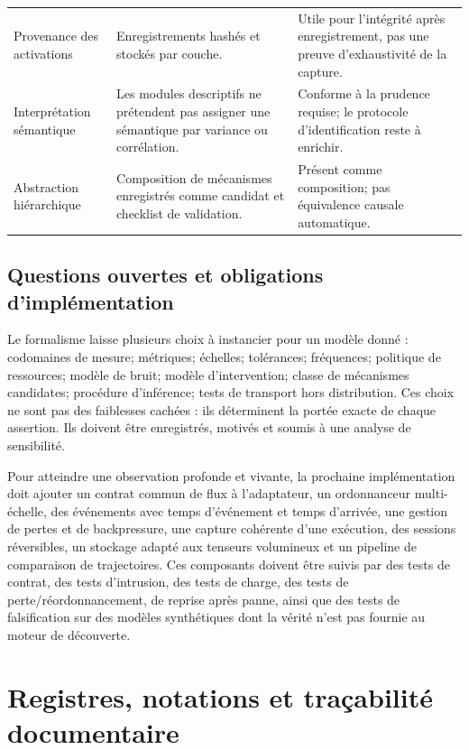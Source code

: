 \documentclass[11pt,oneside]{book}
\theoremstyle{definition}
\theoremstyle{remark}
\newcommand{\1}{\mathbf 1}
\begin{document}
\begin{longtable}{p{}p{}p{}}
Provenance des activations & Enregistrements hashés et stockés par couche. & Utile pour l'intégrité après enregistrement, pas une preuve d'exhaustivité de la capture.\\
Interprétation sémantique & Les modules descriptifs ne prétendent pas assigner une sémantique par variance ou corrélation. & Conforme à la prudence requise; le protocole d'identification reste à enrichir.\\
Abstraction hiérarchique & Composition de mécanismes enregistrés comme candidat et checklist de validation. & Présent comme composition; pas équivalence causale automatique.\\
\bottomrule
\end{longtable}

\chapter{Questions ouvertes et obligations d'implémentation}
Le formalisme laisse plusieurs choix à instancier pour un modèle donné : codomaines de mesure; métriques; échelles; tolérances; fréquences; politique de ressources; modèle de bruit; modèle d'intervention; classe de mécanismes candidates; procédure d'inférence; tests de transport hors distribution. Ces choix ne sont pas des faiblesses cachées : ils déterminent la portée exacte de chaque assertion. Ils doivent être enregistrés, motivés et soumis à une analyse de sensibilité.

Pour atteindre une observation profonde et vivante, la prochaine implémentation doit ajouter un contrat commun de flux à l'adaptateur, un ordonnanceur multi-échelle, des événements avec temps d'événement et temps d'arrivée, une gestion de pertes et de backpressure, une capture cohérente d'une exécution, des sessions réversibles, un stockage adapté aux tenseurs volumineux et un pipeline de comparaison de trajectoires. Ces composants doivent être suivis par des tests de contrat, des tests d'intrusion, des tests de charge, des tests de perte/réordonnancement, de reprise après panne, ainsi que des tests de falsification sur des modèles synthétiques dont la vérité n'est pas fournie au moteur de découverte.

\appendix
\part{Registres, notations et traçabilité documentaire}
\end{document}
